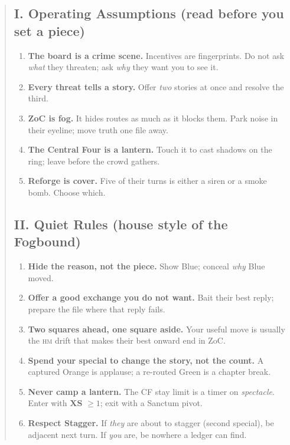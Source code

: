 \documentclass[11pt]{article}
\begin{document}
\begin{quote}
\subsection{I. Operating Assumptions (read before you set a piece)}
\begin{enumerate}\itemsep0.25em
  \item \textbf{The board is a crime scene.} Incentives are fingerprints. Do not ask \emph{what} they threaten; ask \emph{why} they want you to see it.
  \item \textbf{Every threat tells a story.} Offer \emph{two} stories at once and resolve the third.
  \item \textbf{ZoC is fog.} It hides routes as much as it blocks them. Park noise in their eyeline; move truth one file away.
  \item \textbf{The Central Four is a lantern.} Touch it to cast shadows on the ring; leave before the crowd gathers.
  \item \textbf{Reforge is cover.} Five of their turns is either a siren or a smoke bomb. Choose which.
\end{enumerate}

\subsection{II. Quiet Rules (house style of the Fogbound)}
\begin{enumerate}\itemsep0.25em
  \item \textbf{Hide the reason, not the piece.} Show Blue; conceal \emph{why} Blue moved.
  \item \textbf{Offer a good exchange you do not want.} Bait their best reply; prepare the file where that reply fails.
  \item \textbf{Two squares ahead, one square aside.} Your useful move is usually the \textsc{hm} drift that makes their best onward end in ZoC.
  \item \textbf{Spend your special to change the story, not the count.} A captured Orange is applause; a re-routed Green is a chapter break.
  \item \textbf{Never camp a lantern.} The CF stay limit is a timer on \emph{spectacle}. Enter with \textbf{XS} $\ge 1$; exit with a Sanctum pivot.
  \item \textbf{Respect Stagger.} If \emph{they} are about to stagger (second special), be adjacent next turn. If \emph{you} are, be nowhere a ledger can find.
\end{enumerate}


\end{quote}
\end{document}

